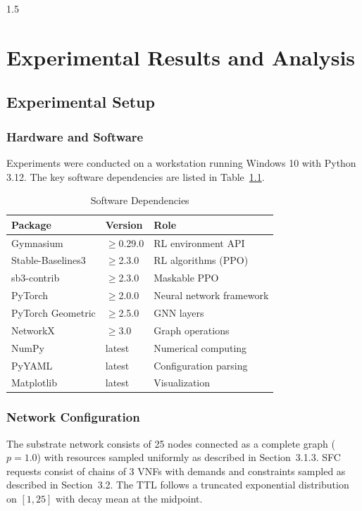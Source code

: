 \documentclass[A4paper,12pt]{report}
\theoremstyle{plain}
\theoremstyle{definition}
\theoremstyle{remark}
\numberwithin{equation}{section}
\begin{document}
\begin{spacing}{1.5}
\chapter{Experimental Results and Analysis}

\section{Experimental Setup}

\subsection{Hardware and Software}

Experiments were conducted on a workstation running Windows 10 with Python 3.12. The key software dependencies are listed in Table~\ref{tab:software}.

\begin{table}[!ht]
\centering
\caption{Software Dependencies}
\label{tab:software}
\begin{tabularx}{\textwidth}{X X X}
\hline
\textbf{Package} & \textbf{Version} & \textbf{Role} \\ \hline
Gymnasium & $\geq$0.29.0 & RL environment API \\
Stable-Baselines3 & $\geq$2.3.0 & RL algorithms (PPO) \\
sb3-contrib & $\geq$2.3.0 & Maskable PPO \\
PyTorch & $\geq$2.0.0 & Neural network framework \\
PyTorch Geometric & $\geq$2.5.0 & GNN layers \\
NetworkX & $\geq$3.0 & Graph operations \\
NumPy & latest & Numerical computing \\
PyYAML & latest & Configuration parsing \\
Matplotlib & latest & Visualization \\
\hline
\end{tabularx}
\end{table}

\subsection{Network Configuration}

The substrate network consists of 25 nodes connected as a complete graph ($p = 1.0$) with resources sampled uniformly as described in Section~3.1.3. SFC requests consist of chains of 3 VNFs with demands and constraints sampled as described in Section~3.2. The TTL follows a truncated exponential distribution on $[1, 25]$ with decay mean at the midpoint.


\end{spacing}
\end{document}
